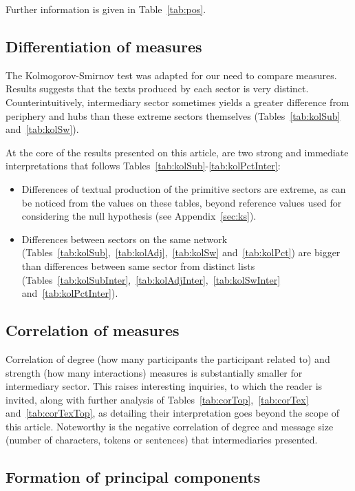 \documentclass[%
 aip,
 jmp,%
 amsmath,amssymb,
 reprint,%
]{revtex4-1}
\begin{document}
Further information is given in Table~\ref{tab:pos}.

\subsection{Differentiation of measures}\label{subsec:di}
The Kolmogorov-Smirnov test was adapted for our need to compare measures.
Results suggests that the texts produced by each sector is very distinct.
Counterintuitively, intermediary sector sometimes yields a greater difference from periphery and hubs than these extreme sectors themselves (Tables~\ref{tab:kolSub} and~\ref{tab:kolSw}).

At the core of the results presented on this article, are two strong and immediate interpretations that follows Tables~\ref{tab:kolSub}-\ref{tab:kolPctInter}:
\begin{itemize}
    \item Differences of textual production of the primitive sectors are extreme, as can be noticed from the values on these tables, beyond reference values used for considering the null hypothesis (see Appendix~\ref{sec:ks}).
    \item Differences between sectors on the same network (Tables~\ref{tab:kolSub},~\ref{tab:kolAdj},~\ref{tab:kolSw} and~\ref{tab:kolPct}) are bigger than differences between same sector from distinct lists (Tables~\ref{tab:kolSubInter},~\ref{tab:kolAdjInter},~\ref{tab:kolSwInter} and~\ref{tab:kolPctInter}).
\end{itemize}

\subsection{Correlation of measures}\label{subsec:cor}

Correlation of degree (how many participants the participant related to) and strength (how many interactions) measures is substantially smaller for intermediary sector. This raises interesting inquiries, to which the reader is invited, along with further analysis of Tables~\ref{tab:corTop},~\ref{tab:corTex} and~\ref{tab:corTexTop}, as detailing their interpretation goes beyond the scope of this article. Noteworthy is the negative correlation of degree and message size (number of characters, tokens or sentences) that intermediaries presented.

\subsection{Formation of principal components}\label{subsec:pc}
\end{document}
